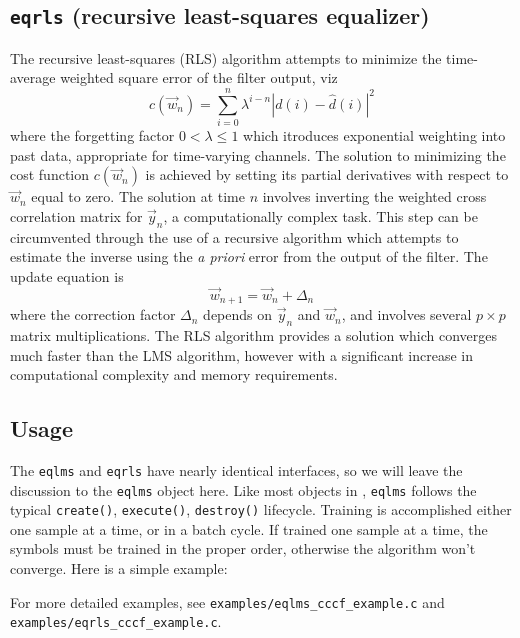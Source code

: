 \subsection{{\tt eqrls} (recursive least-squares equalizer)}
The recursive least-squares (RLS) algorithm attempts to minimize the
time-average weighted square error of the filter output, viz
\begin{equation}
c(\vec{w}_n) = \sum\limits_{i=0}^{n}{ \lambda^{i-n} \left| d(i)-\hat{d}(i)\right|^2 }
\end{equation}
where the forgetting factor $0<\lambda\leq 1$ which itroduces exponential
weighting into past data, appropriate for time-varying channels.
The solution to minimizing the cost function $c(\vec{w}_n)$ is achieved by
setting its partial derivatives with respect to $\vec{w}_n$ equal to zero.
The solution at time $n$ involves inverting the weighted cross correlation
matrix for $\vec{y}_n$, a computationally complex task.
This step can be circumvented through the use of a recursive algorithm which
attempts to estimate the inverse using the {\it a priori} error from the
output of the filter.
The update equation is
\begin{equation}
\label{eq:rls:weight_update}
\vec{w}_{n+1} = \vec{w}_n + \Delta_{n}
\end{equation}
where the correction factor $\Delta_{n}$ depends on $\vec{y}_n$ and $\vec{w}_n$,
and involves several $p \times p$ matrix multiplications.
The RLS algorithm provides a solution which converges much faster than the LMS
algorithm, however with a significant increase in computational complexity and
memory requirements.

\subsection{Usage}
\label{module:equalization:usage}
The {\tt eqlms} and {\tt eqrls} have nearly identical interfaces, so we will
leave the discussion to the {\tt eqlms} object here.
Like most objects in \liquid, {\tt eqlms} follows the typical
{\tt create()}, {\tt execute()}, {\tt destroy()} lifecycle.
Training is accomplished either one sample at a time, or in a batch cycle.
If trained one sample at a time, the symbols must be trained in the proper
order, otherwise the algorithm won't converge.
Here is a simple example:
%

%
For more detailed examples, see
{\tt examples/eqlms\_cccf\_example.c} and
{\tt examples/eqrls\_cccf\_example.c}.

